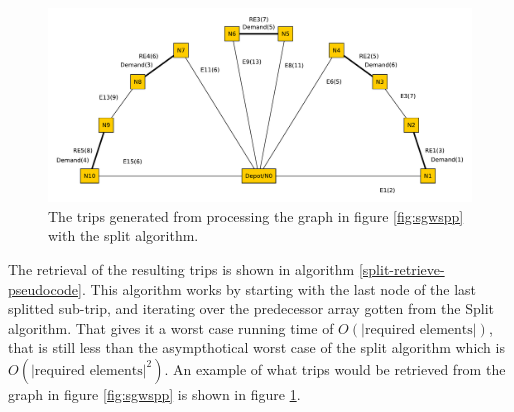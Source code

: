 \begin{figure}[thbp]
    \centerline{\includegraphics[width=\textwidth]{figures/SplitIllustrations/Split_GraphWithRoutes.pdf}}
    \caption{The trips generated from processing the graph in figure \ref{fig:sgwspp} with the split algorithm.}
    \label{fig:sgwr}
\end{figure}

The retrieval of the resulting trips is shown in algorithm \ref{split-retrieve-pseudocode}. This algorithm works by starting with the last node of the last splitted sub-trip, and iterating over the predecessor array gotten from the Split algorithm. That gives it a worst case running time of $O(|\text{required elements}|)$, that is still less than the asympthotical worst case of the split algorithm which is $O(|\text{required elements}|^2)$. An example of what trips would be retrieved from the graph in figure \ref{fig:sgwspp} is shown in figure \ref{fig:sgwr}.






\cleardoublepage
